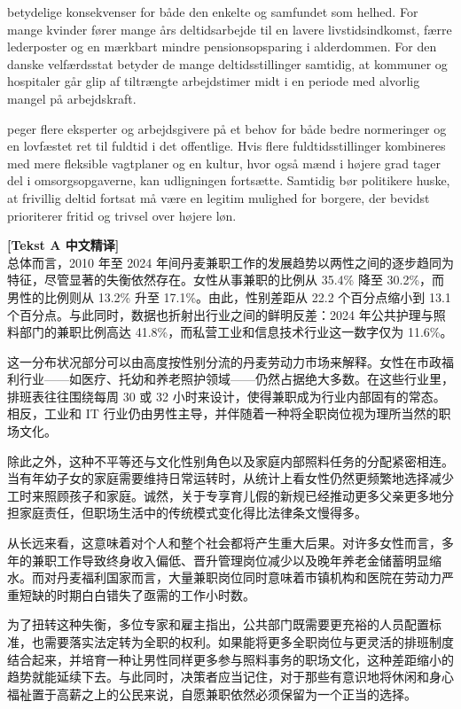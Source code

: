 betydelige konsekvenser for både den enkelte og samfundet som helhed. For mange kvinder fører mange års deltidsarbejde til en lavere livstidsindkomst, færre lederposter og en mærkbart mindre pensionsopsparing i alderdommen. For den danske velfærdsstat betyder de mange deltidsstillinger samtidig, at kommuner og hospitaler går glip af tiltrængte arbejdstimer midt i en periode med alvorlig mangel på arbejdskraft.

 peger flere eksperter og arbejdsgivere på et behov for både bedre normeringer og en lovfæstet ret til fuldtid i det offentlige. Hvis flere fuldtidsstillinger kombineres med mere fleksible vagtplaner og en kultur, hvor også mænd i højere grad tager del i omsorgsopgaverne, kan udligningen fortsætte. Samtidig bør politikere huske, at frivillig deltid fortsat må være en legitim mulighed for borgere, der bevidst prioriterer fritid og trivsel over højere løn.

\begin{transbox}
\small
\textbf{\color{NCDTeal}[Tekst A 中文精译]}\\
总体而言，2010 年至 2024 年间丹麦兼职工作的发展趋势以两性之间的逐步趋同为特征，尽管显著的失衡依然存在。女性从事兼职的比例从 35.4\% 降至 30.2\%，而男性的比例则从 13.2\% 升至 17.1\%。由此，性别差距从 22.2 个百分点缩小到 13.1 个百分点。与此同时，数据也折射出行业之间的鲜明反差：2024 年公共护理与照料部门的兼职比例高达 41.8\%，而私营工业和信息技术行业这一数字仅为 11.6\%。

这一分布状况部分可以由高度按性别分流的丹麦劳动力市场来解释。女性在市政福利行业——如医疗、托幼和养老照护领域——仍然占据绝大多数。在这些行业里，排班表往往围绕每周 30 或 32 小时来设计，使得兼职成为行业内部固有的常态。相反，工业和 IT 行业仍由男性主导，并伴随着一种将全职岗位视为理所当然的职场文化。

除此之外，这种不平等还与文化性别角色以及家庭内部照料任务的分配紧密相连。当有年幼子女的家庭需要维持日常运转时，从统计上看女性仍然更频繁地选择减少工时来照顾孩子和家庭。诚然，关于专享育儿假的新规已经推动更多父亲更多地分担家庭责任，但职场生活中的传统模式变化得比法律条文慢得多。

从长远来看，这意味着对个人和整个社会都将产生重大后果。对许多女性而言，多年的兼职工作导致终身收入偏低、晋升管理岗位减少以及晚年养老金储蓄明显缩水。而对丹麦福利国家而言，大量兼职岗位同时意味着市镇机构和医院在劳动力严重短缺的时期白白错失了亟需的工作小时数。

为了扭转这种失衡，多位专家和雇主指出，公共部门既需要更充裕的人员配置标准，也需要落实法定转为全职的权利。如果能将更多全职岗位与更灵活的排班制度结合起来，并培育一种让男性同样更多参与照料事务的职场文化，这种差距缩小的趋势就能延续下去。与此同时，决策者应当记住，对于那些有意识地将休闲和身心福祉置于高薪之上的公民来说，自愿兼职依然必须保留为一个正当的选择。
\end{transbox}

